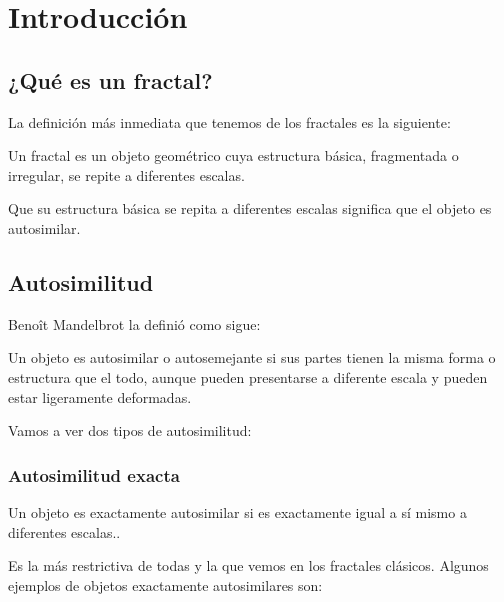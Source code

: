 \chapter{Introducción}

\section{¿Qué es un fractal?}

La definición más inmediata que tenemos de los fractales es la siguiente:

\begin{definition}
    Un fractal es un objeto geométrico cuya estructura básica, fragmentada o irregular, se repite a diferentes escalas.
\end{definition}

\noindent Que su estructura básica se repita a diferentes escalas significa que el objeto es autosimilar.

\section{Autosimilitud}

Benoît Mandelbrot la definió como sigue:

\begin{definition}
    Un objeto es autosimilar o autosemejante si sus partes tienen la misma forma o estructura que el todo, aunque pueden presentarse a diferente escala y pueden estar ligeramente deformadas.
\end{definition}

\noindent
\large Vamos a ver dos tipos de autosimilitud:

\subsection{Autosimilitud exacta}

\begin{definition}
    Un objeto es exactamente autosimilar si es exactamente igual a sí mismo a diferentes escalas..
\end{definition}

\noindent
Es la más restrictiva de todas y la que vemos en los fractales clásicos. Algunos ejemplos de objetos exactamente autosimilares son:

